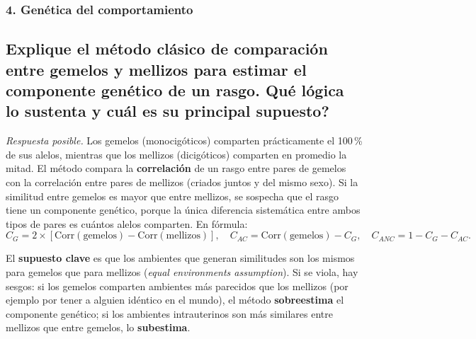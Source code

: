 \documentclass[11pt, a4paper]{article}
\newcommand{\pregunta}[1]{\subsection{#1}}
\newcommand{\eje}[1]{\subsubsection{#1}}
\begin{document}
\eje{4. Gen\'etica del comportamiento}
\pregunta{Explique el m\'etodo cl\'asico de comparaci\'on entre gemelos y mellizos para estimar el componente gen\'etico de un rasgo. \textquestiondown Qu\'e l\'ogica lo sustenta y cu\'al es su principal supuesto?}

\begin{respuesta}
\textit{Respuesta posible.} Los gemelos (monocig\'oticos) comparten pr\'acticamente el 100\,\% de sus alelos, mientras que los mellizos (dicig\'oticos) comparten en promedio la mitad. El m\'etodo compara la \textbf{correlaci\'on} de un rasgo entre pares de gemelos con la correlaci\'on entre pares de mellizos (criados juntos y del mismo sexo). Si la similitud entre gemelos es mayor que entre mellizos, se sospecha que el rasgo tiene un componente gen\'etico, porque la \'unica diferencia sistem\'atica entre ambos tipos de pares es cu\'antos alelos comparten. En f\'ormula:
\[
C_G = 2 \times [\mathrm{Corr}(\text{gemelos}) - \mathrm{Corr}(\text{mellizos})], \quad
C_{AC} = \mathrm{Corr}(\text{gemelos}) - C_G, \quad
C_{ANC} = 1 - C_G - C_{AC}.
\]

El \textbf{supuesto clave} es que los ambientes que generan similitudes son los mismos para gemelos que para mellizos (\emph{equal environments assumption}). Si se viola, hay sesgos: si los gemelos comparten ambientes m\'as parecidos que los mellizos (por ejemplo por tener a alguien id\'entico en el mundo), el m\'etodo \textbf{sobreestima} el componente gen\'etico; si los ambientes intrauterinos son m\'as similares entre mellizos que entre gemelos, lo \textbf{subestima}.
\end{respuesta}
\end{document}
